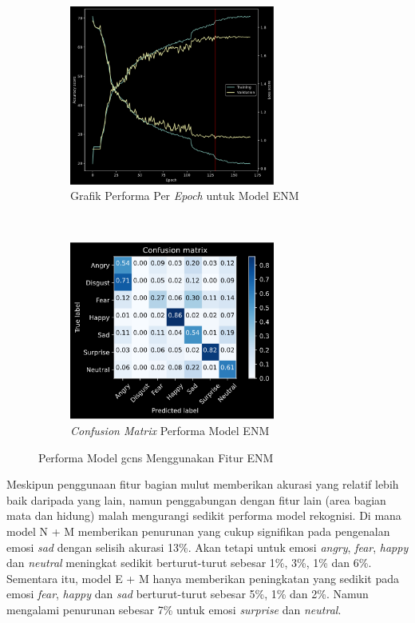 \begin{figure}[!t]
    \centering
    \begin{subfigure}[t]{6.75cm}
        \includegraphics[width=6.75cm]{gambar/eksperimen4b8_grafik1.png}
        \caption{Grafik Performa Per \textit{Epoch} untuk Model ENM}
        \label{fig:confusionmatrixeksperimen4b8}
    \end{subfigure}
    ~~~
    \begin{subfigure}[t]{6.75cm}
        \includegraphics[width=6.75cm]{gambar/eksperimen4b8_matriks1.png}
        \caption{\textit{Confusion Matrix} Performa Model ENM}
        \label{fig:confusionmatrixeksperimen4b8}
    \end{subfigure}
    \caption{Performa Model \acrshort{gcns} Menggunakan Fitur ENM}
    \label{fig:hasileksperimen4b8}
\end{figure}

Meskipun penggunaan fitur bagian mulut memberikan akurasi yang relatif lebih baik daripada yang lain, namun penggabungan dengan fitur lain (area bagian mata dan hidung) malah mengurangi sedikit performa model rekognisi. Di mana model N + M memberikan penurunan yang cukup signifikan pada pengenalan emosi \textit{sad} dengan selisih akurasi 13\%. Akan tetapi untuk emosi \textit{angry}, \textit{fear}, \textit{happy} dan \textit{neutral} meningkat sedikit berturut-turut sebesar 1\%, 3\%, 1\% dan 6\%. Sementara itu, model E + M hanya memberikan peningkatan yang sedikit pada emosi \textit{fear}, \textit{happy} dan \textit{sad} berturut-turut sebesar 5\%, 1\% dan 2\%. Namun mengalami penurunan sebesar 7\% untuk emosi \textit{surprise} dan \textit{neutral}.

